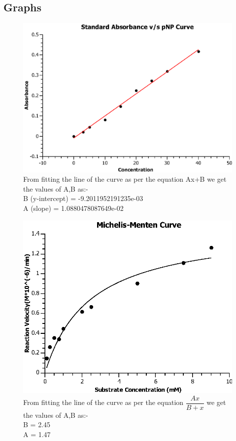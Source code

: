 \documentclass[12pt]{article}
\theoremstyle{definition}
\theoremstyle{definition}
\theoremstyle{remark}
\begin{document}
\subsection{Graphs}
\begin{figure}[H]
\includegraphics[width=16cm]{Graphstandard.eps}
\centering
From fitting the line of the curve as per the equation Ax+B we get the values of A,B as:-\\[2ex]
B (y-intercept) = -9.2011952191235e-03 \\
A (slope) = 1.0880478087649e-02 
\end{figure}
\begin{figure}[H]
\includegraphics[width=16cm]{Graphst2.eps}
\centering
From fitting the line of the curve as per the equation $\dfrac{Ax}{B+x}$ we get the values of A,B as:-\\[2ex] 
B = 2.45 \\ 
A = 1.47 
\end{figure}
\end{document}
